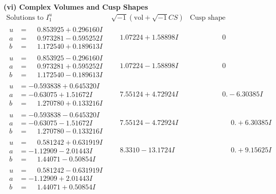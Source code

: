 \documentclass[1p]{elsarticle_modified}
\theoremstyle{definition}
\newcommand{\I}{\sqrt{-1}}
\begin{document}
\newpage\flushleft \textbf{(vi) Complex Volumes and Cusp Shapes}
$$\begin{array}{c|c|c}  
\text{Solutions to }I^u_{1}& \I (\text{vol} + \sqrt{-1}CS) & \text{Cusp shape}\\
 \hline 
\begin{aligned}
u &= \phantom{-}0.853925 + 0.296160 I \\
a &= \phantom{-}0.973281 - 0.595252 I \\
b &= \phantom{-}1.172540 + 0.189613 I\end{aligned}
 & \phantom{-}1.07224 + 1.58898 I & \phantom{-0.000000 } 0 \\ \hline\begin{aligned}
u &= \phantom{-}0.853925 - 0.296160 I \\
a &= \phantom{-}0.973281 + 0.595252 I \\
b &= \phantom{-}1.172540 - 0.189613 I\end{aligned}
 & \phantom{-}1.07224 - 1.58898 I & \phantom{-0.000000 } 0 \\ \hline\begin{aligned}
u &= -0.593838 + 0.645320 I \\
a &= -0.63075 + 1.51672 I \\
b &= \phantom{-}1.270780 + 0.133216 I\end{aligned}
 & \phantom{-}7.55124 + 4.72924 I & \phantom{-0.000000 } 0. - 6.30385 I \\ \hline\begin{aligned}
u &= -0.593838 - 0.645320 I \\
a &= -0.63075 - 1.51672 I \\
b &= \phantom{-}1.270780 - 0.133216 I\end{aligned}
 & \phantom{-}7.55124 - 4.72924 I & \phantom{-0.000000 -}0. + 6.30385 I \\ \hline\begin{aligned}
u &= \phantom{-}0.581242 + 0.631919 I \\
a &= -1.12909 - 2.01443 I \\
b &= \phantom{-}1.44071 - 0.50854 I\end{aligned}
 & \phantom{-}8.3310 - 13.1724 I & \phantom{-0.000000 -}0. + 9.15625 I \\ \hline\begin{aligned}
u &= \phantom{-}0.581242 - 0.631919 I \\
a &= -1.12909 + 2.01443 I \\
b &= \phantom{-}1.44071 + 0.50854 I\end{aligned}

\end{array}$$
\end{document}
